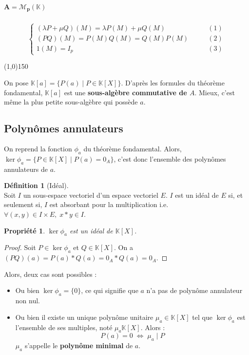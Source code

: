 \documentclass[12pt]{book}
\let\ensembleNombre\mathbb
\newcommand*\K{\ensuremath{\ensembleNombre{K}}}
\newcommand{\hr}{\begin{center}
					\line(1,0){150}
 				 \end{center}}
\newtheorem*{prop}{Propriété}
\theoremstyle{definition}
\newtheorem*{defi}{Définition}
\theoremstyle{remark}
\newenvironment{fdef}
  {\begin{mdframed}[roundcorner=10pt, linewidth=1pt]\begin{defi}}
  {\end{defi}\end{mdframed}}
\begin{document}
       \subparagraph{$\bm{A = \mathcal M_p(\K)}$}
       \[\begin{cases}
			(\lambda P + \mu Q)(M) = \lambda P(M) + \mu Q(M) \qquad &(1)\\
			(PQ)(M) = P(M)Q(M) = Q(M)P(M) \qquad &(2)\\
			1(M) = I_p \qquad &(3)
       \end{cases}\]
       
\hr
       
	On pose $\K[a] = \lbrace P(a) \;|\; P \in \K[X] \rbrace$. D'après les formules du théorème fondamental, $\K[a]$ est une \textbf{sous-algèbre commutative de $A$}. Mieux, c'est même la plus petite sous-algèbre qui possède $a$.
	
	\subsection{Polynômes annulateurs}
	On reprend la fonction $\phi_a$ du théorème fondamental. Alors, $\ker \phi_a = \lbrace P \in \K[X] \;|\; P(a) = 0_A \rbrace$, c'est donc l'ensemble des polynômes annulateurs de $a$.
	
	\begin{fdef}[Idéal]\mbox{~}\\
	Soit $I$ un sous-espace vectoriel d'un espace vectoriel $E$. $I$ est un idéal de $E$ si, et seulement si, $I$ est absorbant pour la multiplication i.e. $\forall (x,y) \in I \times E, \; x*y \in I$.
	\end{fdef}
	
	\begin{prop}
	$\ker \phi_a$ est un idéal de $\K[X]$.
	\end{prop}
	\begin{proof}
	Soit $P \in \ker \phi_a$ et $Q \in \K[X]$. On a $(PQ)(a) = P(a) * Q(a) = 0_A * Q(a) = 0_A$.
	\end{proof}
	
	Alors, deux cas sont possibles : 
	\begin{itemize}
	\item Ou bien $\ker \phi_a = \lbrace 0 \rbrace$, ce qui signifie que $a$ n'a pas de polynôme annulateur non nul.
	\item Ou bien il existe un unique polynôme unitaire $\mu_a \in \K[X]$ tel que $\ker \phi_a$ est l'ensemble de ses multiples, noté $\mu_a \K[X]$. Alors :
	\[\boxed{P(a) = 0 \;\Longleftrightarrow\; \mu_a \;|\; P }\]
	$\mu_a$ s'appelle le \textbf{polynôme minimal} de $a$.
	\end{itemize}
	
\end{document}
